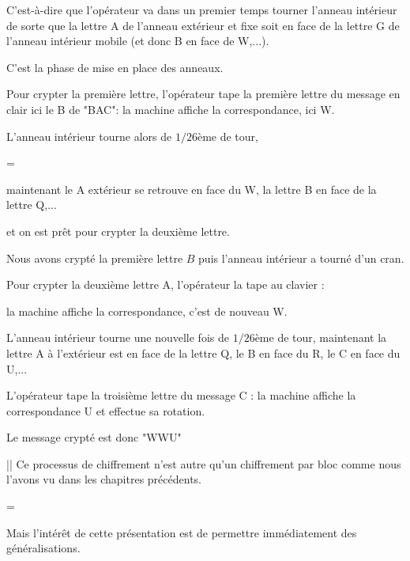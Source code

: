 \change

C'est-à-dire que l'opérateur va dans un premier temps tourner l'anneau intérieur de sorte que la lettre A de l'anneau extérieur et fixe 
  soit en face de la lettre G de l'anneau intérieur mobile (et donc B en face de W,...).

C'est la phase de mise en place des anneaux.
 
\change

Pour crypter la première lettre, l'opérateur tape la première lettre du message en clair ici le B de "BAC": 
la machine affiche la correspondance, ici W.

\change

L'anneau intérieur tourne alors de $1/26$ème de tour, 

=

maintenant le A extérieur se retrouve en face du W, la lettre B en face de la lettre Q,...

et on est prêt pour crypter la deuxième lettre.

\diapo

Nous avons crypté la première lettre $B$ puis l'anneau intérieur a tourné d'un cran.

\change 

Pour crypter la deuxième lettre A, l'opérateur la tape au clavier :

la machine affiche la correspondance, c'est de nouveau W.

\change

L'anneau intérieur tourne une nouvelle fois de $1/26$ème de tour, 
maintenant la lettre A à l'extérieur est en face de la lettre Q, 
le B en face du R, le C en face du U,...

\change

L'opérateur tape la troisième lettre du message C : 
la machine affiche la correspondance U et effectue sa rotation.
   
\change

Le message crypté est donc "WWU"
   

|| Ce processus de chiffrement n'est autre qu'un chiffrement par bloc comme nous l'avons vu dans les chapitres précédents.

=

Mais l'intérêt de cette présentation est de permettre immédiatement des généralisations.

